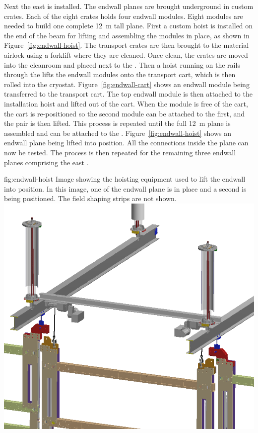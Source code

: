 Next the east  is installed. The endwall planes are brought underground in custom crates. Each of the eight crates holds four endwall modules.  Eight modules are needed to build one complete \SI{12}{m} tall plane.  First a custom hoist is installed on the end of the  beam for lifting and assembling the modules in place, as shown in Figure~\ref{fig:endwall-hoist}. The  transport crates are then brought to the material airlock using a forklift where they are cleaned.  Once clean, the crates are moved into the cleanroom and placed next to the . Then a hoist running on the rails through the  lifts the endwall modules onto the transport cart, which is then rolled into the cryostat. Figure~\ref{fig:endwall-cart} shows an endwall module being transferred to the transport cart. The top endwall module is then attached to the installation hoist and lifted out of the cart. When the module is free of  the cart, the cart is re-positioned so the second module can be attached to the first, and the pair is then lifted. This process is repeated until the full \SI{12}{m}  plane is assembled and can be attached to the . 
Figure~\ref{fig:endwall-hoist} shows an endwall plane being lifted into position.
All the  connections inside the plane can now be tested. The process is then repeated for the remaining three endwall planes comprising the east  . 
 
 \begin{dunefigure}{fig:endwall-hoist}
  {Image showing the hoisting equipment used to lift the endwall into position. In this image, one of the endwall plane is in place and a second is being positioned. The field shaping strips are not shown.}
\includegraphics[width=.5\textwidth]{graphics/endwall-hoist.png}
\end{dunefigure}
 
